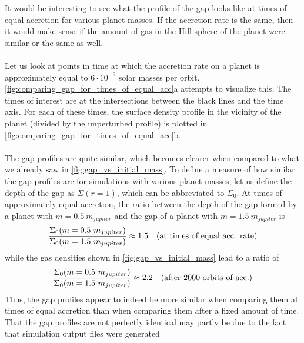       \newpage
      \noindent
      It would be interesting to see what the profile of the gap looks like 
      at times of equal accretion for various planet masses. If the accretion 
      rate is the same, then it would make sense if the amount of gas in the 
      Hill sphere of the planet were similar or the same as well. \\
      \\
      Let us look at points in time at which the accretion rate on a planet 
      is approximately equal to $6\cdot10^{-9}$ solar masses per orbit. 
      \autoref{fig:comparing_gap_for_times_of_equal_acc}a attempts to visualize
      this. The times of interest are at the intersections between the black 
      lines and the time axis. For each of these times, the surface density 
      profile in the vicinity of the planet (divided by the unperturbed 
      profile) is plotted in 
      \autoref{fig:comparing_gap_for_times_of_equal_acc}b. \\
      \\
      The gap profiles are quite similar, which becomes clearer when 
      compared to what we already saw in \autoref{fig:gap_vs_initial_mass}. 
      To define a measure of how similar the gap profiles are for simulations 
      with various planet masses, let us define the depth of the gap as 
      $\Sigma(r=1)$, which can be abbreviated to $\Sigma_0$. At times of 
      approximately equal accretion, the ratio 
      between the depth of the gap formed by a planet with $m=0.5\ m_{jupiter}$ 
      and the gap of a planet with $m=1.5\ m_{jupiter}$ is
      $$\frac{\Sigma_0(m=0.5\ m_{jupiter})}{\Sigma_0(m=1.5\ m_{jupiter})}
      \approx1.5\ \ \ \textnormal{(at times of equal acc. rate)}$$
      while the gas densities shown in \autoref{fig:gap_vs_initial_mass} lead 
      to a ratio of 
      $$\frac{\Sigma_0(m=0.5\ m_{jupiter})}{\Sigma_0(m=1.5\ m_{jupiter})}
      \approx2.2\ \ \ \textnormal{(after 2000 orbits of acc.)}$$
      Thus, the gap profiles appear to indeed be more similar when comparing 
      them at times of equal accretion than when comparing them after a fixed 
      amount of time. That the gap profiles are not perfectly identical may 
      partly be due to the fact that simulation output files were generated 
